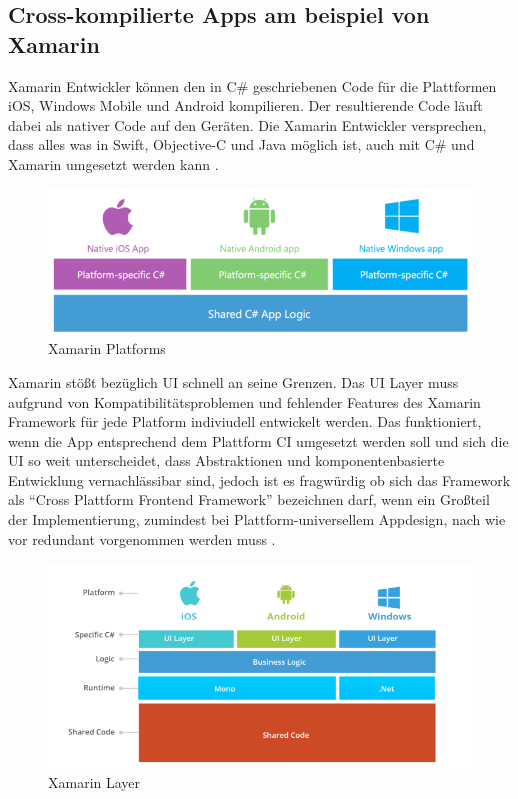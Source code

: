 \subsection{Cross-kompilierte Apps am beispiel von Xamarin}

Xamarin Entwickler können den in C\# geschriebenen Code für die Plattformen iOS, Windows Mobile und Android kompilieren.
Der resultierende Code läuft dabei als nativer Code auf den Geräten.
Die Xamarin Entwickler versprechen, dass alles was in Swift, Objective-C und
Java möglich ist, auch mit C\# und Xamarin umgesetzt werden kann \cite{projectxamarin}.

\begin{figure}[ht]
 \centering
 \includegraphics[width=0.9\linewidth]{kapitel2/csharp_xamarin.png}
 \caption{Xamarin Platforms \cite{7Reas20:online}}
\end{figure}
\vspace{1cm}

Xamarin stößt bezüglich \ac{UI} schnell an seine Grenzen. Das \ac{UI} Layer muss aufgrund von Kompatibilitätsproblemen und fehlender Features des Xamarin Framework
für jede Platform indiviudell entwickelt werden. Das funktioniert, wenn die App entsprechend dem Plattform CI umgesetzt werden soll und sich die \ac{UI} so weit unterscheidet,
dass Abstraktionen und komponentenbasierte Entwicklung vernachlässibar sind, jedoch ist es fragwürdig ob sich das Framework als ``Cross Plattform Frontend Framework'' bezeichnen darf,
wenn ein Großteil der Implementierung, zumindest bei Plattform-universellem Appdesign, nach wie vor redundant vorgenommen werden muss \cite{7Reas20:online}.

\begin{figure}[ht]
 \centering
 \includegraphics[width=0.8\linewidth]{kapitel2/xamarin_ui_blocker.png}
 \caption{Xamarin Layer \cite{7Reas20:online}}
\end{figure}

